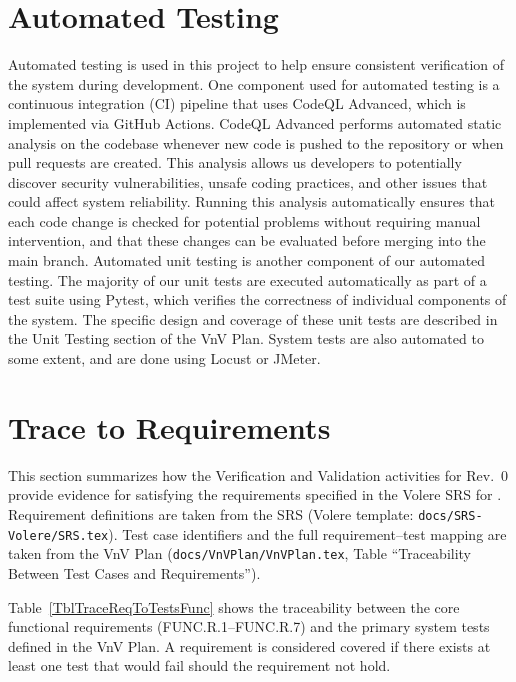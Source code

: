 \documentclass[12pt, titlepage]{article}
\begin{document}
\section{Automated Testing}

\par{Automated testing is used in this project to help ensure consistent verification of 
the system during development. One component used for automated testing is a 
continuous integration (CI) pipeline that uses CodeQL Advanced, which is implemented via GitHub Actions. 
CodeQL Advanced performs automated static analysis on the codebase whenever new code is pushed to the repository or when 
pull requests are created. This analysis allows us developers to potentially discover security vulnerabilities, 
unsafe coding practices, and other issues that could affect system reliability. Running this analysis automatically 
ensures that each code change is checked for potential problems without requiring manual 
intervention, and that these changes can be evaluated before merging into the main branch. 
Automated unit testing is another component of our automated testing. The majority of our unit tests are executed 
automatically as part of a test suite using Pytest, which verifies the correctness of individual components 
of the system. The specific design and coverage of these unit tests are described in the Unit Testing 
section of the VnV Plan. System tests are also automated to some extent, and are done using Locust or JMeter.}
		
\section{Trace to Requirements}
\label{sec:trace-req}

This section summarizes how the Verification and Validation activities for Rev.~0
provide evidence for satisfying the requirements specified in the Volere SRS
for \progname{}.  Requirement definitions are taken from the SRS (Volere template:
\texttt{docs/SRS-Volere/SRS.tex}). Test case identifiers and the full
requirement--test mapping are taken from the VnV Plan
(\texttt{docs/VnVPlan/VnVPlan.tex}, Table ``Traceability Between Test Cases and Requirements'').

Table~\ref{TblTraceReqToTestsFunc} shows the traceability between the core
functional requirements (FUNC.R.1--FUNC.R.7) and the primary system tests defined in the
VnV Plan.  A requirement is considered covered if there exists at least one
test that would fail should the requirement not hold.
\end{document}
